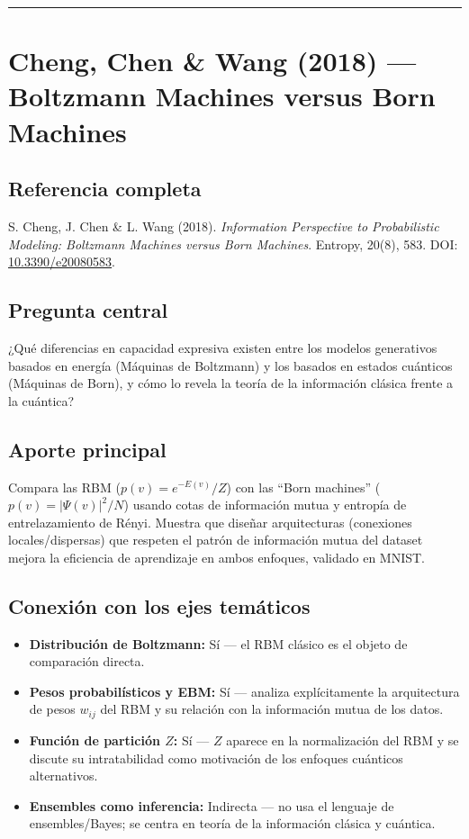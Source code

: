 \documentclass[12pt]{article}
\begin{document}
\bigskip
\hrule
\bigskip

\section{Cheng, Chen \& Wang (2018) --- Boltzmann Machines versus Born Machines}

\subsection*{Referencia completa}
S. Cheng, J. Chen \& L. Wang (2018). \textit{Information Perspective to Probabilistic
Modeling: Boltzmann Machines versus Born Machines}. Entropy, 20(8), 583. DOI:
\href{https://doi.org/10.3390/e20080583}{10.3390/e20080583}. \cite{cheng2018}

\subsection*{Pregunta central}
¿Qué diferencias en capacidad expresiva existen entre los modelos generativos basados en
energía (Máquinas de Boltzmann) y los basados en estados cuánticos (Máquinas de Born), y cómo
lo revela la teoría de la información clásica frente a la cuántica?

\subsection*{Aporte principal}
Compara las RBM ($p(v)=e^{-E(v)}/Z$) con las ``Born machines'' ($p(v)=|\Psi(v)|^2/N$) usando
cotas de información mutua y entropía de entrelazamiento de Rényi. Muestra que diseñar
arquitecturas (conexiones locales/dispersas) que respeten el patrón de información mutua del
dataset mejora la eficiencia de aprendizaje en ambos enfoques, validado en MNIST.

\subsection*{Conexión con los ejes temáticos}
\begin{itemize}
  \item \textbf{Distribución de Boltzmann:} Sí --- el RBM clásico es el objeto de comparación directa.
  \item \textbf{Pesos probabilísticos y EBM:} Sí --- analiza explícitamente la arquitectura de pesos $w_{ij}$ del RBM y su relación con la información mutua de los datos.
  \item \textbf{Función de partición $Z$:} Sí --- $Z$ aparece en la normalización del RBM y se discute su intratabilidad como motivación de los enfoques cuánticos alternativos.
  \item \textbf{Ensembles como inferencia:} Indirecta --- no usa el lenguaje de ensembles/Bayes; se centra en teoría de la información clásica y cuántica.
\end{itemize}
\end{document}
